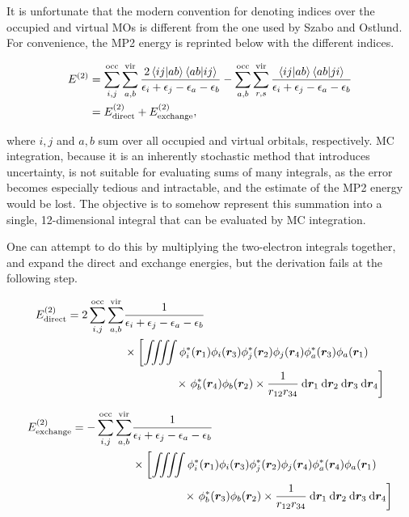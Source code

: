 It is unfortunate that the modern convention for denoting indices over the
occupied and virtual MOs is different from the one used by Szabo and Ostlund.
For convenience, the MP2 energy is reprinted below with the different indices.

\begin{equation}
\begin{split}
	\perturbE[]{2} &=
	\sum_{i,j}^{\text{occ}} \sum_{a,b}^{\text{vir}}
	\frac{2\braket{ij|ab}\braket{ab|ij}}{\eps_i + \eps_j - \eps_a -\eps_b}
	-
	\sum_{a,b}^{\text{occ}} \sum_{r,s}^{\text{vir}}
	\frac{\braket{ij|ab}\braket{ab|ji}}{\eps_i + \eps_j - \eps_a -\eps_b}
	\\
	&= \perturbE[\text{direct}]{2} + \perturbE[\text{exchange}]{2},
	\label{eq:mp2-ee}
\end{split}
\end{equation}

\noindent where $i,j$ and $a,b$ sum over all occupied and virtual orbitals,
respectively. MC integration, because it is an inherently stochastic method that
introduces uncertainty, is not suitable for evaluating sums of many integrals,
as the error becomes especially tedious and intractable, and the estimate of the
MP2 energy would be lost. The objective is to somehow represent this summation
into a single, 12-dimensional integral that can be evaluated by MC integration.

One can attempt to do this by multiplying the two-electron integrals together,
and expand the direct and exchange energies, but the derivation fails at the
following step.

\begin{equation}
\begin{split}
\perturbE[\text{direct}]{2}
= 2 \sum_{i,j}^{\text{occ}} \sum_{a,b}^{\text{vir}}
   &\frac{1}{\eps_i + \eps_j - \eps_a - \eps_b} \\
   &\times \left[ \iiiint \phi_i^*(\bm r_1) \phi_i(\bm r_3) \phi_j^*(\bm r_2) \phi_j(\bm r_4) \phi_a^*(\bm r_3) \phi_a(\bm r_1) \right. \\
   &\qquad\qquad\;\; \times \left. \phi_b^*(\bm r_4) \phi_b(\bm r_2) \times \frac{1}{r_{12}r_{34}} \dif \bm r_1 \dif \bm r_2 \dif \bm r_3 \dif \bm r_4 \right]
\end{split}
\end{equation}

\begin{equation}
\begin{split}
\perturbE[\text{exchange}]{2}
= - \sum_{i,j}^{\text{occ}} \sum_{a,b}^{\text{vir}}
   &\frac{1}{\eps_i + \eps_j - \eps_a - \eps_b} \\
   &\times \left[ \iiiint \phi_i^*(\bm r_1) \phi_i(\bm r_3) \phi_j^*(\bm r_2) \phi_j(\bm r_4) \phi_a^*(\bm r_4) \phi_a(\bm r_1) \right. \\
   &\qquad\qquad\;\; \times \left. \phi_b^*(\bm r_3) \phi_b(\bm r_2) \times \frac{1}{r_{12}r_{34}} \dif \bm r_1 \dif \bm r_2 \dif \bm r_3 \dif \bm r_4 \right]
\end{split}
\end{equation}


